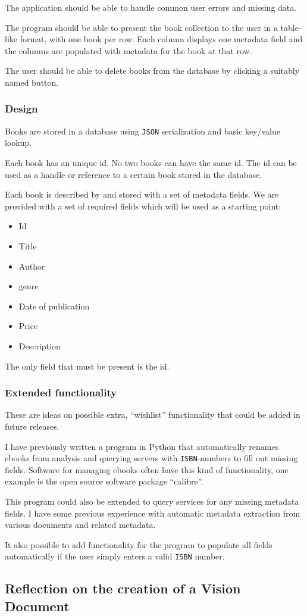 The application should be able to handle common user errors and missing data.

The program should be able to present the book collection to the user in a
table-like format, with one book per row. Each column displays one metadata
field and the columns are populated with metadata for the book at that row. 

The user should be able to delete books from the database by clicking a
suitably named button.


\subsubsection{Design}
Books are stored in a database using \texttt{JSON} serialization and basic
key/value lookup.

Each book has an unique id. No two books can have the same id.  The id can be
used as a handle or reference to a certain book stored in the database.

Each book is described by and stored with a set of metadata fields.  We are
provided with a set of required fields which will be used as a starting point:

\begin{itemize}
  \item Id
  \item Title
  \item Author
  \item genre
  \item Date of publication
  \item Price
  \item Description
\end{itemize}

The only field that must be present is the id.


\subsubsection{Extended functionality}
These are ideas on possible extra, ``wishlist'' functionality that could be
added in future releases.

I have previously written a program in Python that automatically renames ebooks
from analysis and querying servers with \texttt{ISBN}-numbers to fill out
missing fields. Software for managing ebooks often have this kind of
functionality, one example is the open source software package
``calibre''\cite{calibre}.

This program could also be extended to query services for any missing metadata
fields. I have some previous experience with automatic metadata extraction from
various documents and related metadata.

It also possible to add functionality for the program to populate all fields
automatically if the user simply enters a valid \texttt{ISBN} number.


\subsection{Reflection on the creation of a Vision Document}\label{task-2-reflect}
